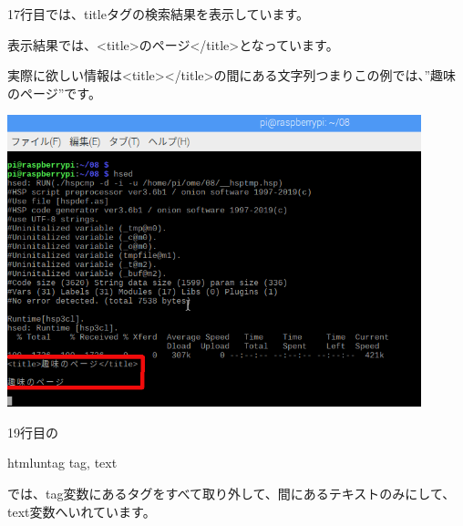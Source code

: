 \bigskip

17行目では、titleタグの検索結果を表示しています。

表示結果では、{\textless}title{\textgreater}のページ{\textless}/title{\textgreater}となっています。

実際に欲しい情報は{\textless}title{\textgreater}{\textless}/title{\textgreater}の間にある文字列つまりこの例では、”趣味のページ”です。



\begin{center}
\includegraphics[width=0.9\textwidth]{./text08-img/textbook-img015.png}

\end{center}


\bigskip


\bigskip

\clearpage
19行目の

htmluntag tag, text

では、tag変数にあるタグをすべて取り外して、間にあるテキストのみにして、text変数へいれています。


\bigskip






